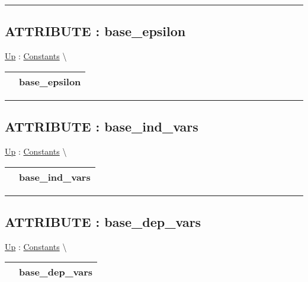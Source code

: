 \par


\rule{\linewidth}{0.5pt}
\subsection*{ATTRIBUTE : base\_epsilon}
\hypertarget{ecldoc:logisticregression.constants.base_epsilon}{}
\hyperlink{ecldoc:LogisticRegression.Constants}{Up} :
\hspace{0pt} \hyperlink{ecldoc:LogisticRegression.Constants}{Constants} \textbackslash 

{\renewcommand{\arraystretch}{1.5}
\begin{tabularx}{\textwidth}{|>{\raggedright\arraybackslash}l|X|}
\hline
\hspace{0pt} & base\_epsilon \\
\hline
\end{tabularx}
}

\par


\rule{\linewidth}{0.5pt}
\subsection*{ATTRIBUTE : base\_ind\_vars}
\hypertarget{ecldoc:logisticregression.constants.base_ind_vars}{}
\hyperlink{ecldoc:LogisticRegression.Constants}{Up} :
\hspace{0pt} \hyperlink{ecldoc:LogisticRegression.Constants}{Constants} \textbackslash 

{\renewcommand{\arraystretch}{1.5}
\begin{tabularx}{\textwidth}{|>{\raggedright\arraybackslash}l|X|}
\hline
\hspace{0pt} & base\_ind\_vars \\
\hline
\end{tabularx}
}

\par


\rule{\linewidth}{0.5pt}
\subsection*{ATTRIBUTE : base\_dep\_vars}
\hypertarget{ecldoc:logisticregression.constants.base_dep_vars}{}
\hyperlink{ecldoc:LogisticRegression.Constants}{Up} :
\hspace{0pt} \hyperlink{ecldoc:LogisticRegression.Constants}{Constants} \textbackslash 

{\renewcommand{\arraystretch}{1.5}
\begin{tabularx}{\textwidth}{|>{\raggedright\arraybackslash}l|X|}
\hline
\hspace{0pt} & base\_dep\_vars \\
\hline
\end{tabularx}
}

